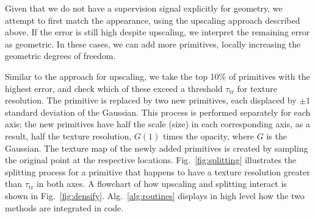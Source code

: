 Given that we do not have a supervision signal explicitly for geometry, 
we attempt to first match the appearance, using the upscaling approach described above.
If the error is still high despite upscaling,
we interpret the remaining error as geometric.
In these cases,
we can add more primitives,
locally increasing the geometric degrees of freedom.


Similar to the approach for upscaling, we take the top 10\% of primitives with the highest error, and check which of these exceed a threshold $\tau_{\mathrm{tr}}$ for texture resolution. The primitive is replaced by two new primitives, each displaced by $\pm 1$ standard deviation of the Gaussian.
This process is performed separately for each axis; the new primitives have half the scale (size) in each corresponding axis,
as a result, half the texture resolution,
$G(1)$ times the opacity, where $G$ is the Gaussian.
The texture map of the newly added primitives is created by sampling the original point at the respective locations.
Fig.~\ref{fig:splitting} illustrates the splitting process for a primitive that happens to have a texture resolution greater than $\tau_{\mathrm{tr}}$ in both axes. A flowchart of how upscaling and splitting interact is shown in Fig.~\ref{fig:densify}. Alg.~\ref{alg:routines} displays in high level how the two methods are integrated in code.

